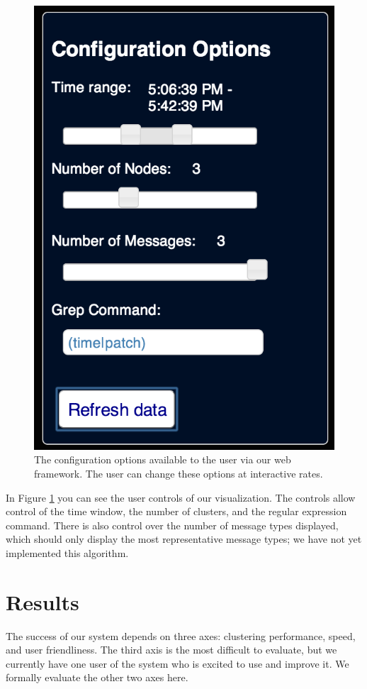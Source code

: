 \documentclass[conference]{style/acmsiggraph}
\begin{document}
\begin{figure}[t]
    \centering
    \includegraphics[width=0.7\columnwidth]{images/screenshot_controls.png}
    \caption{The configuration options available to the user via our web framework. The user can change these options at interactive rates.}
    \label{fig:ss_controls}
\end{figure}

In Figure \ref{fig:ss_controls} you can see the user controls of our visualization.
The controls allow control of the time window, the number of clusters, and the regular expression command.
There is also control over the number of message types displayed, which should only display the most representative message types;
we have not yet implemented this algorithm.

\section{Results}

The success of our system depends on three axes: clustering performance, speed, and user friendliness.
The third axis is the most difficult to evaluate, but we currently have one user of the system who is excited to use and improve it.
We formally evaluate the other two axes here.
\end{document}
